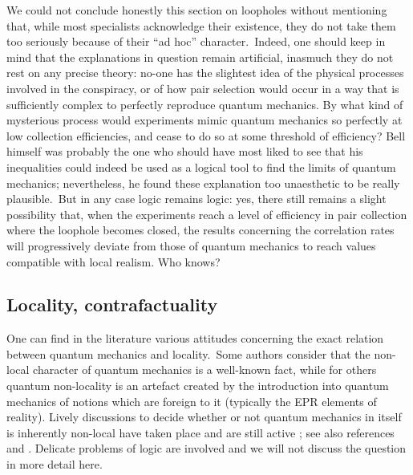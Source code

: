\documentclass[12pt,onecolumn]{article}%
\begin{document}
We could not conclude honestly this section on loopholes without mentioning
that, while most specialists acknowledge their existence, they do not take
them too seriously because of their ``ad hoc'' character.\ Indeed, one should
keep in mind that the explanations in question remain artificial, inasmuch
they do not rest on any precise theory: no-one has the slightest idea of the
physical processes involved in the conspiracy, or of how pair selection would
occur in a way that is sufficiently complex to perfectly reproduce quantum
mechanics. By what kind of mysterious process would experiments mimic quantum
mechanics so perfectly at low collection efficiencies, and cease to do so at
some threshold of efficiency? Bell himself was probably the one who should
have most liked to see that his inequalities could indeed be used as a logical
tool to find the limits of quantum mechanics; nevertheless, he found these
explanation too unaesthetic to be really plausible.\ But in any case logic
remains logic: yes, there still remains a slight possibility that, when the
experiments reach a level of efficiency in pair collection where the loophole
becomes closed, the results concerning the correlation rates will
progressively deviate from those of quantum mechanics to reach values
compatible with local realism. Who knows?

\subsection{Locality, contrafactuality}

\label{contra}

One can find in the literature various attitudes concerning the exact relation
between quantum mechanics and locality.\ Some authors consider that the
non-local character of quantum mechanics is a well-known fact, while for
others quantum non-locality is an artefact created by the introduction into
quantum mechanics of notions which are foreign to it (typically the EPR
elements of reality). Lively discussions to decide whether or not quantum
mechanics in itself is inherently non-local have taken place and are still
active \cite{Stapp} \cite{Stapp-3} \cite{Mermin-6}; see also references
\cite{d'Espagnat} and \cite{Redhead} \cite{CS}. Delicate problems of logic are
involved and we will not discuss the question in more detail here.
\end{document}

